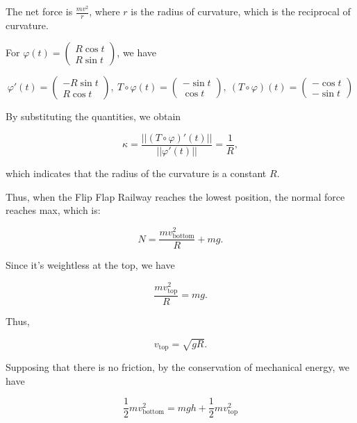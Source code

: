 \documentclass{article}
\begin{document}
    The net force is $\frac{mv^2}{r}$, where $r$ is the radius of curvature, which is the reciprocal of curvature.

    For
    $
        \varphi(t) =
        \begin{pmatrix}
            R\cos t \\
            R\sin t
        \end{pmatrix}
    $,
    we have

    $$
        \varphi'(t) =
        \begin{pmatrix}
            -R\sin t \\
            R\cos t
        \end{pmatrix},\
        T\circ\varphi(t) =
        \begin{pmatrix}
            -\sin t \\
            \cos t
        \end{pmatrix},\
        (T\circ\varphi)(t) =
        \begin{pmatrix}
            -\cos t \\
            -\sin t
        \end{pmatrix}
    $$

    By substituting the quantities, we obtain

    $$
        \kappa=\frac{||(T\circ\varphi)'(t)||}{||\varphi'(t)||}=\frac{1}{R},
    $$

    which indicates that the radius of the curvature is a constant $R$.

    Thus, when the Flip Flap Railway reaches the lowest position, the normal force reaches max, which is:

    \begin{equation}
        N=\frac{mv_{\mathrm{bottom}}^2}{R}+mg.
    \end{equation}

    Since it's weightless at the top, we have

    \begin{equation}
        \frac{mv_{\mathrm{top}}^2}{R}=mg.
    \end{equation}

    Thus,

    $$
        v_{\mathrm{top}}=\sqrt{gR}.
    $$

    Supposing that there is no friction, by the conservation of mechanical energy, we have

    \begin{equation}
        \frac{1}{2}mv_{\mathrm{bottom}}^2=mgh+\frac{1}{2}mv_{\mathrm{top}}^2
    \end{equation}
\end{document}
